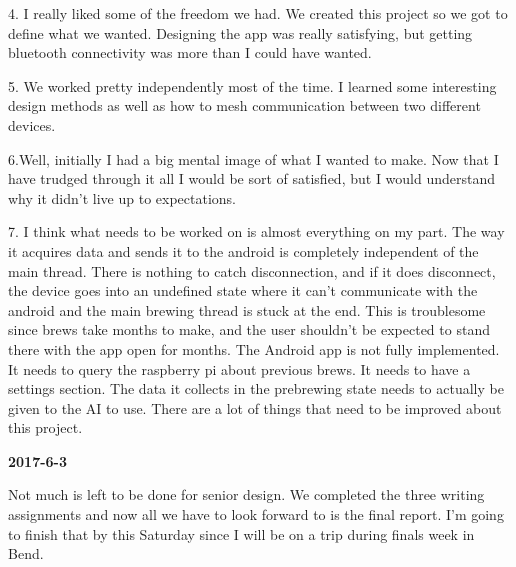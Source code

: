 4. I really liked some of the freedom we had. We created this project so we got to define what we wanted. Designing the app was really satisfying, but getting bluetooth connectivity was more than I could have wanted.

5. We worked pretty independently most of the time. I learned some interesting design methods as well as how to mesh communication between two different devices.

6.Well, initially I had a big mental image of what I wanted to make. Now that I have trudged through it all I would be sort of satisfied, but I would understand why it didn't live up to expectations.

7. I think what needs to be worked on is almost everything on my part. The way it acquires data and sends it to the android is completely independent of the main thread. There is nothing to catch disconnection, and if it does disconnect, the device goes into an undefined state where it can't communicate with the android and the main brewing thread is stuck at the end. This is troublesome since brews take months to make, and the user shouldn't be expected to stand there with the app open for months. The Android app is not fully implemented. It needs to query the raspberry pi about previous brews. It needs to have a settings section. The data it collects in the prebrewing state needs to actually be given to the AI to use. There are a lot of things that need to be improved about this project.

\textbf{2017-6-3}

Not much is left to be done for senior design. We completed the three writing assignments and now all we have to look forward to is the final report. I'm going to finish that by this Saturday since I will be on a trip during finals week in Bend.
